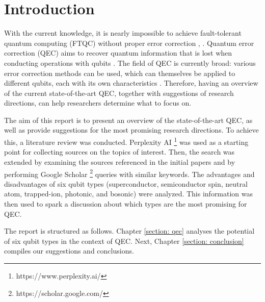 \section{Introduction}
With the current knowledge, it is nearly impossible to achieve fault-tolerant quantum computing (FTQC) without proper error correction \cite{roffe2019quantum}, \cite{devitt2013quantum}. Quantum error correction (QEC) aims to recover quantum information that is lost when conducting operations with qubits \cite{roffe2019quantum}. The field of QEC is currently broad: various error correction methods can be used, which can themselves be applied to different qubits, each with its own characteristics \cite{roffe2019quantum}. Therefore, having an overview of the current state-of-the-art QEC, together with suggestions of research directions, can help researchers determine what to focus on. \par

The aim of this report is to present an overview of the state-of-the-art QEC, as well as provide suggestions for the most promising research directions. To achieve this, a literature review was conducted. Perplexity AI \footnote{https://www.perplexity.ai/} was used as a starting point for collecting sources on the topics of interest. Then, the search was extended by examining the sources referenced in the initial papers and by performing Google Scholar \footnote{https://scholar.google.com/} queries with similar keywords. The advantages and disadvantages of six qubit types (superconductor, semiconductor spin, neutral atom, trapped-ion, photonic, and bosonic) were analyzed. This information was then used to spark a discussion about which types are the most promising for QEC. \par

The report is structured as follows. Chapter \ref{section: qec} analyses the potential of six qubit types in the context of QEC. Next, Chapter \ref{section: conclusion} compiles our suggestions and conclusions. \par




